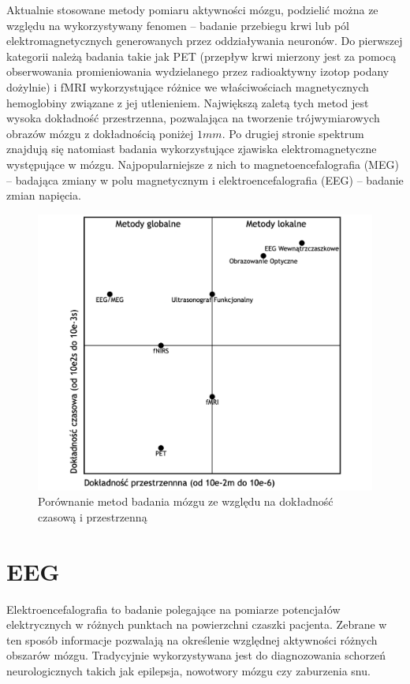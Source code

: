 \documentclass{./assets/wfis}
\begin{document}
Aktualnie stosowane metody pomiaru aktywności mózgu, podzielić można ze względu na wykorzystywany fenomen – badanie przebiegu krwi lub pól elektromagnetycznych generowanych przez oddziaływania neuronów. Do pierwszej kategorii należą badania takie jak PET (przepływ krwi mierzony jest za pomocą obserwowania promieniowania wydzielanego przez radioaktywny izotop podany dożylnie) i fMRI wykorzystujące różnice we właściwościach magnetycznych hemoglobiny związane z jej utlenieniem. Największą zaletą tych metod jest wysoka dokładność przestrzenna, pozwalająca na tworzenie trójwymiarowych obrazów mózgu z dokładnością poniżej $1mm$. Po drugiej stronie  spektrum znajdują się natomiast badania wykorzystujące zjawiska elektromagnetyczne występujące w mózgu. Najpopularniejsze z nich to magnetoencefalografia (MEG) – badająca zmiany w polu magnetycznym i elektroencefalografia (EEG) – badanie zmian napięcia. 

\begin{figure}[h]
    \centering
    \includegraphics[width=0.5\columnwidth]{thesis/assets/brain_imaging_comparasion.png}
    \caption{Porównanie metod badania mózgu ze względu na dokładność czasową i przestrzenną}
    \label{fig:brain-imaging-comparasion}
\end{figure}

\section{EEG}
Elektroencefalografia to badanie polegające na pomiarze potencjałów elektrycznych w różnych punktach na powierzchni czaszki pacjenta. Zebrane w ten sposób informacje pozwalają na określenie względnej aktywności różnych obszarów mózgu. Tradycyjnie wykorzystywana jest do diagnozowania schorzeń neurologicznych takich jak epilepsja, nowotwory mózgu czy zaburzenia snu.
\end{document}
